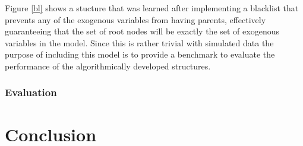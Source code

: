 \documentclass{article}
\begin{document}
Figure \ref{bl} shows a stucture that was learned after implementing a blacklist that prevents any of the exogenous variables from having parents, effectively guaranteeing that the set of root nodes will be exactly the set of exogenous variables in the model. Since this is rather trivial with simulated data the purpose of including this model is to provide a benchmark to evaluate the performance of the algorithmically developed structures.

\subsubsection{Evaluation}

\section{Conclusion}

\printbibliography
\end{document}
